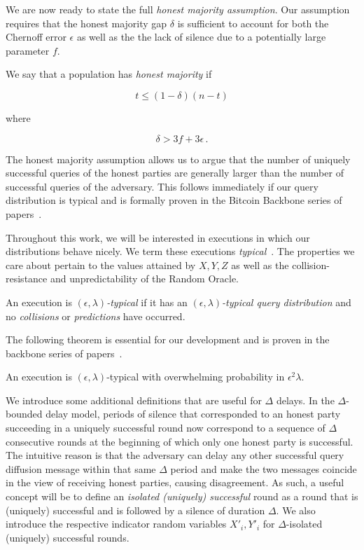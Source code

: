 We are now ready to state the full \emph{honest majority assumption}. Our
assumption requires that the honest majority gap $\delta$ is sufficient to
account for both the Chernoff error $\epsilon$ as well as the the lack of
silence due to a potentially large parameter $f$.

\begin{definition}\index{$\delta$}
  We say that a population has \emph{honest majority} if

  \[
  t \leq (1 - \delta)(n - t)
  \]

  where

  \[
  \delta > 3f + 3\epsilon\,.
  \]
\end{definition}

The honest majority assumption allows us to argue that the number of uniquely
successful queries of the honest parties are generally larger than the number of
successful queries of the adversary. This follows immediately if our query
distribution is typical and is formally proven in the Bitcoin Backbone series of
papers~\cite{backbone,varbackbone}.

Throughout this work, we will be interested in executions in which our
distributions behave nicely. We term these executions
\emph{typical}~\cite{backbone}. The properties we care about pertain to the
values attained by $X, Y, Z$ as well as the collision-resistance and
unpredictability of the Random Oracle.

\begin{definition}
  An execution is \emph{$(\epsilon, \lambda)$-typical} if it has an
  \emph{$(\epsilon, \lambda)$-typical query distribution} and no
  \emph{collisions} or \emph{predictions} have occurred.
\end{definition}

The following theorem is essential for our development and is proven in the
backbone series of papers~\cite{backbone,varbackbone}.

\begin{theorem}[Typicality]
  An execution is $(\epsilon, \lambda)$-typical with overwhelming probability
  in $\epsilon^2 \lambda$.
\end{theorem}

We introduce some additional definitions that are useful for $\Delta$ delays.
In the $\Delta$-bounded delay model, periods of silence that corresponded to
an honest party succeeding in a uniquely successful round now correspond to a
sequence of $\Delta$ consecutive rounds at the beginning of which only one
honest party is successful. The intuitive reason is that the adversary can delay
any other successful query diffusion message within that same $\Delta$ period
and make the two messages coincide in the view of receiving honest parties,
causing disagreement. As such, a useful concept will be to define an
\emph{isolated (uniquely) successful} round as a round that is (uniquely)
successful and is followed by a silence of duration $\Delta$. We also introduce
the respective indicator random variables $X'_i, Y'_i$ for $\Delta$-isolated
(uniquely) successful rounds.

